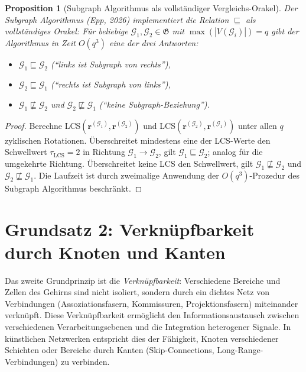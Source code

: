 ﻿\documentclass[12pt, a4paper, openany]{report}
\newtheorem{proposition}[theorem]{Proposition}
\newcommand{\calG}{\mathcal{G}}
\begin{document}
\begin{proposition}[Subgraph Algorithmus als vollständiger Vergleichs-Orakel]
\label{prop:subgraph_oracle}
Der Subgraph Algorithmus (Epp, 2026) implementiert die Relation
$\sqsubseteq$ als vollständiges Orakel: Für beliebige
$\calG_1, \calG_2 \in \mathfrak{G}$ mit $\max(|V(\calG_i)|) = q$ gibt der
Algorithmus in Zeit $O(q^3)$ eine der drei Antworten:
\begin{itemize}
  \item $\calG_1 \sqsubseteq \calG_2$ (``links ist Subgraph von rechts''),
  \item $\calG_2 \sqsubseteq \calG_1$ (``rechts ist Subgraph von links''),
  \item $\calG_1 \not\sqsubseteq \calG_2$ und $\calG_2 \not\sqsubseteq \calG_1$ (``keine Subgraph-Beziehung'').
\end{itemize}
\end{proposition}

\begin{proof}
Berechne LCS$(\bm{r}^{(\calG_1)}, \bm{r}^{(\calG_2)})$ und
LCS$(\bm{r}^{(\calG_2)}, \bm{r}^{(\calG_1)})$ unter allen $q$ zyklischen
Rotationen.  Überschreitet mindestens eine der LCS-Werte den Schwellwert
$\tau_{\mathrm{LCS}} = 2$ in Richtung $\calG_1 \to \calG_2$, gilt
$\calG_1 \sqsubseteq \calG_2$; analog für die umgekehrte Richtung.
Überschreitet keine LCS den Schwellwert, gilt
$\calG_1 \not\sqsubseteq \calG_2$ und $\calG_2 \not\sqsubseteq \calG_1$.  Die Laufzeit ist durch zweimalige
Anwendung der $O(q^3)$-Prozedur des Subgraph Algorithmus beschränkt.
\end{proof}

\section{Grundsatz 2: Verknüpfbarkeit durch Knoten und Kanten}
\label{sec:bio_linkability}

Das zweite Grundprinzip ist die \emph{Verknüpfbarkeit}: Verschiedene
Bereiche und Zellen des Gehirns sind nicht isoliert, sondern durch
ein dichtes Netz von Verbindungen (Assoziationsfasern, Kommissuren,
Projektionsfasern) miteinander verknüpft.  Diese Verknüpfbarkeit ermöglicht
den Informationsaustausch zwischen verschiedenen Verarbeitungsebenen und
die Integration heterogener Signale.  In künstlichen Netzwerken entspricht
dies der Fähigkeit, Knoten verschiedener Schichten oder Bereiche durch
Kanten (Skip-Connections, Long-Range-Verbindungen) zu verbinden.
\end{document}

